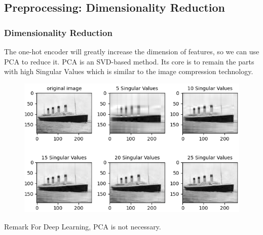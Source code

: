 \documentclass{beamer}
\begin{document}
\subsection{Preprocessing: Dimensionality Reduction}
\begin{frame}
	\frametitle{Dimensionality Reduction}
	\begin{flushleft}
		The one-hot encoder will greatly increase the dimension of features, so we can use PCA to reduce it. PCA is an SVD-based method. Its core is to remain the parts with high Singular Values which is similar to the image compression technology.
	\end{flushleft}
	\begin{center}
			\begin{figure}
		    \includegraphics[width=0.5\linewidth]{./src/figures/11.png}
		  \end{figure}
		\end{center}
	\begin{block}{Remark}
		For Deep Learning, PCA is not necessary.
	\end{block}
\end{frame}

\end{document}

